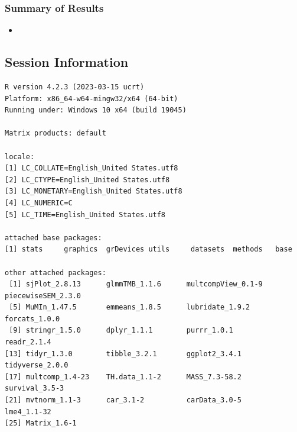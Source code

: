 \documentclass[
]{article}
\providecommand{\tightlist}{%
  \setlength{\itemsep}{0pt}\setlength{\parskip}{0pt}}
\begin{document}
\hypertarget{summary-of-results}{%
\subsubsection{Summary of Results}\label{summary-of-results}}

\begin{itemize}
\tightlist
\item
\end{itemize}

\hypertarget{session-information}{%
\subsection{Session Information}\label{session-information}}

\begin{verbatim}
R version 4.2.3 (2023-03-15 ucrt)
Platform: x86_64-w64-mingw32/x64 (64-bit)
Running under: Windows 10 x64 (build 19045)

Matrix products: default

locale:
[1] LC_COLLATE=English_United States.utf8 
[2] LC_CTYPE=English_United States.utf8   
[3] LC_MONETARY=English_United States.utf8
[4] LC_NUMERIC=C                          
[5] LC_TIME=English_United States.utf8    

attached base packages:
[1] stats     graphics  grDevices utils     datasets  methods   base     

other attached packages:
 [1] sjPlot_2.8.13      glmmTMB_1.1.6      multcompView_0.1-9 piecewiseSEM_2.3.0
 [5] MuMIn_1.47.5       emmeans_1.8.5      lubridate_1.9.2    forcats_1.0.0     
 [9] stringr_1.5.0      dplyr_1.1.1        purrr_1.0.1        readr_2.1.4       
[13] tidyr_1.3.0        tibble_3.2.1       ggplot2_3.4.1      tidyverse_2.0.0   
[17] multcomp_1.4-23    TH.data_1.1-2      MASS_7.3-58.2      survival_3.5-3    
[21] mvtnorm_1.1-3      car_3.1-2          carData_3.0-5      lme4_1.1-32       
[25] Matrix_1.6-1      


\end{verbatim}
\end{document}
